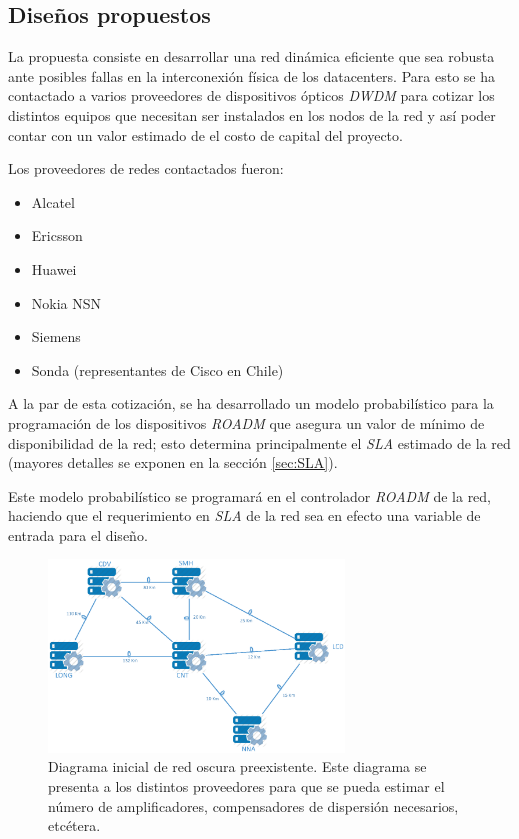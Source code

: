 \subsection{Diseños propuestos}
\label{sec:disenos}

La propuesta consiste en desarrollar una red dinámica eficiente que
sea robusta ante posibles fallas en la interconexión física de los
datacenters. Para esto se ha contactado a varios proveedores de
dispositivos ópticos \emph{DWDM} para cotizar los distintos equipos
que necesitan ser instalados en los nodos de la red y así poder contar
con un valor estimado de el costo de capital del proyecto.

Los proveedores de redes contactados fueron:
\begin{itemize}
\item Alcatel
\item Ericsson
\item Huawei
\item Nokia NSN
\item Siemens
\item Sonda (representantes de Cisco en Chile)
\end{itemize}

A la par de esta cotización, se ha desarrollado un modelo
probabilístico para la programación de los dispositivos \emph{ROADM}
que asegura un valor de mínimo de disponibilidad de la red; esto
determina principalmente el \emph{SLA} estimado de la red (mayores
detalles se exponen en la sección \ref{sec:SLA}).

Este modelo probabilístico se programará en el controlador
\emph{ROADM} de la red, haciendo que el requerimiento en \emph{SLA} de
la red sea en efecto una variable de entrada para el diseño.

\begin{figure}[h]
\centering
\includegraphics[width=0.7\textwidth]{Imagenes/Diagrama_Fibra_Oscura.eps}
\caption{Diagrama inicial de red oscura preexistente. Este diagrama se
  presenta a los distintos proveedores para que se pueda estimar el
  número de amplificadores, compensadores de dispersión necesarios,
  etcétera.}
\end{figure}

